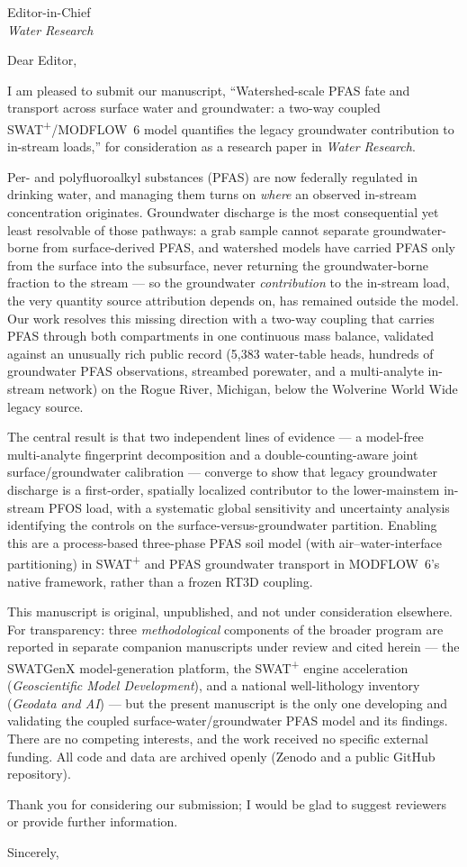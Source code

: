 \documentclass[11pt]{letter}
\begin{document}
\begin{letter}{Editor-in-Chief\\ \emph{Water Research}}
\opening{Dear Editor,}

I am pleased to submit our manuscript, ``Watershed-scale PFAS fate and transport
across surface water and groundwater: a two-way coupled SWAT\textsuperscript{+}/MODFLOW~6
model quantifies the legacy groundwater contribution to in-stream loads,'' for
consideration as a research paper in \emph{Water Research}.

Per- and polyfluoroalkyl substances (PFAS) are now federally regulated in drinking
water, and managing them turns on \emph{where} an observed in-stream concentration
originates. Groundwater discharge is the most consequential yet least resolvable of
those pathways: a grab sample cannot separate groundwater-borne from surface-derived
PFAS, and watershed models have carried PFAS only from the surface into the subsurface,
never returning the groundwater-borne fraction to the stream --- so the groundwater
\emph{contribution} to the in-stream load, the very quantity source attribution depends
on, has remained outside the model. Our work resolves this missing direction with a
two-way coupling that carries PFAS through both compartments in one continuous mass
balance, validated against an unusually rich public record (5{,}383 water-table heads,
hundreds of groundwater PFAS observations, streambed porewater, and a multi-analyte
in-stream network) on the Rogue River, Michigan, below the Wolverine World Wide legacy
source.

The central result is that two independent lines of evidence --- a model-free
multi-analyte fingerprint decomposition and a double-counting-aware joint
surface/groundwater calibration --- converge to show that legacy groundwater discharge
is a first-order, spatially localized contributor to the lower-mainstem in-stream PFOS
load, with a systematic global sensitivity and uncertainty analysis identifying the
controls on the surface-versus-groundwater partition. Enabling this are a process-based
three-phase PFAS soil model (with air--water-interface partitioning) in
SWAT\textsuperscript{+} and PFAS groundwater transport in MODFLOW~6's native framework,
rather than a frozen RT3D coupling.

This manuscript is original, unpublished, and not under consideration elsewhere. For
transparency: three \emph{methodological} components of the broader program are reported
in separate companion manuscripts under review and cited herein --- the SWATGenX
model-generation platform, the SWAT\textsuperscript{+} engine acceleration
(\emph{Geoscientific Model Development}), and a national well-lithology inventory
(\emph{Geodata and AI}) --- but the present manuscript is the only one developing and
validating the coupled surface-water/groundwater PFAS model and its findings. There are
no competing interests, and the work received no specific external funding. All code and
data are archived openly (Zenodo and a public GitHub repository).

Thank you for considering our submission; I would be glad to suggest reviewers or
provide further information.

\closing{Sincerely,}
\end{letter}
\end{document}
